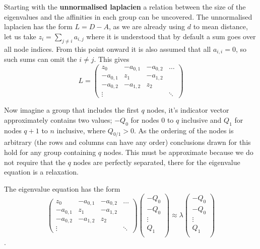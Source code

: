 Starting with the \textbf{unnormalised laplacien} a relation between the size of the eigenvalues and the affinities in each group can be uncovered.
The unnormalised laplacien has the form \(L = D -A\), as we are already using \(d\) to mean distance,
let us take \(z_i = \sum_{j\neq i} a_{i,j}\) where it is understood that by default a sum goes over all node indices.
From this point onward it is also assumed that all \(a_{i,i} = 0\), so such sums can omit the \(i \ne j\).
This gives 
\begin{equation}
    L = 
    \begin{pmatrix}
        z_0 & -a_{0,1} & -a_{0,2} & \hdots \\
        -a_{0,1} & z_1 & -a_{1,2} & \\
        -a_{0,2} & -a_{1,2} & z_2 & \\
        \vdots   &          &     & \ddots 
    \end{pmatrix}
\end{equation}

Now imagine a group that includes the first \(q\) nodes,
it's indicator vector approximately contains two values; \(-Q_0\) for nodes \(0\) to \(q\) inclusive
and \(Q_1\) for nodes \(q+1\) to \(n\) inclusive,  where \(Q_{0/1} > 0\).
As the ordering of the nodes is arbitrary (the rows and columns can have any order)
conclusions drawn for this hold for any group containing \(q\) nodes.
This must be approximate because we do not require that the \(q\) nodes are perfectly separated,
there for the eigenvalue equation is a relaxation.

The eigenvalue equation has the form
\begin{equation}
    \begin{pmatrix}
        z_0 & -a_{0,1} & -a_{0,2} & \hdots \\
        -a_{0,1} & z_1 & -a_{1,2} & \\
        -a_{0,2} & -a_{1,2} & z_2 & \\
        \vdots   &          &     & \ddots 
    \end{pmatrix}
    \begin{pmatrix}
        -Q_0 \\
        -Q_0 \\
        \vdots \\
        Q_1 \\
    \end{pmatrix}
    \approx \lambda
    \begin{pmatrix}
        -Q_0 \\
        -Q_0 \\
        \vdots \\
        Q_1 \\
    \end{pmatrix}
\end{equation}.

